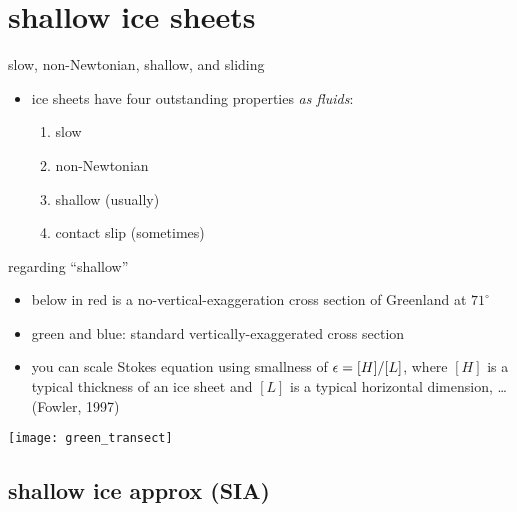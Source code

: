 
\section{shallow ice sheets}

\begin{frame}{slow, non-Newtonian, shallow, and sliding}

\begin{itemize}
\item ice sheets have four outstanding properties \emph{as fluids}:
  \begin{enumerate}
  \item slow
  \item non-Newtonian
  \item shallow (usually)
  \item contact slip (sometimes)
  \end{enumerate}
\end{itemize}
\end{frame}


\begin{frame}{regarding ``shallow''}

\begin{itemize}
\item below in \alert{red} is a no-vertical-exaggeration cross section of Greenland at $71^\circ$
\small
\item green and blue: standard vertically-exaggerated cross section
\item you can scale Stokes equation using smallness of $\epsilon = [H]/[L]$, where $[H]$ is a typical thickness of an ice sheet and $[L]$ is a typical horizontal dimension, \dots (Fowler, 1997)\nocite{Fowler}
\end{itemize}

\begin{center}
  \texttt{[image: green\_transect]}
\end{center}
\end{frame}


\subsection{shallow ice approx (SIA)}

